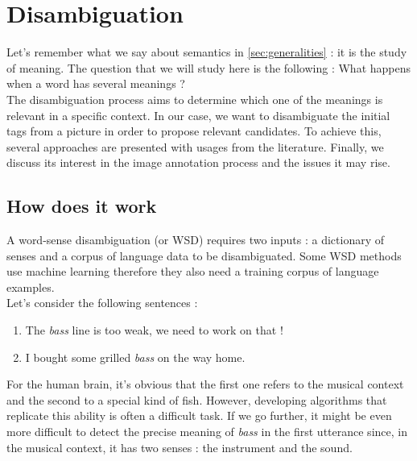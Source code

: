 
\chapter{Disambiguation} %

\label{chapter:Disambiguation} %


Let's remember what we say about semantics in \ref{sec:generalities} : it is the study of meaning. The question that we will study here is the following : What happens when a word has several meanings ?\\

The disambiguation process aims to determine which one of the meanings is relevant in a specific context. In our case, we want to disambiguate the initial tags from a picture in order to propose relevant candidates. To achieve this, several approaches are presented with usages from the literature. Finally, we discuss its interest in the image annotation process and the issues it may rise. 

\section{How does it work} %
\label{sec:how_does_it_work}
A word-sense disambiguation (or WSD) requires two inputs : a dictionary of senses and a corpus of language data to be disambiguated. Some WSD methods use machine learning therefore they also need a training corpus of language examples.\\
Let's consider the following sentences :
\begin{enumerate}
	\item The \textit{bass} line is too weak, we need to work on that !
	\item I bought some grilled \textit{bass} on the way home.
\end{enumerate}
For the human brain, it's obvious that the first one refers to the musical context and the second to a special kind of fish. However, developing algorithms that replicate this ability is often a difficult task. If we go further, it might be even more difficult to detect the precise meaning of \textit{bass} in the first utterance since, in the musical context, it has two senses : the instrument and the sound.\\

